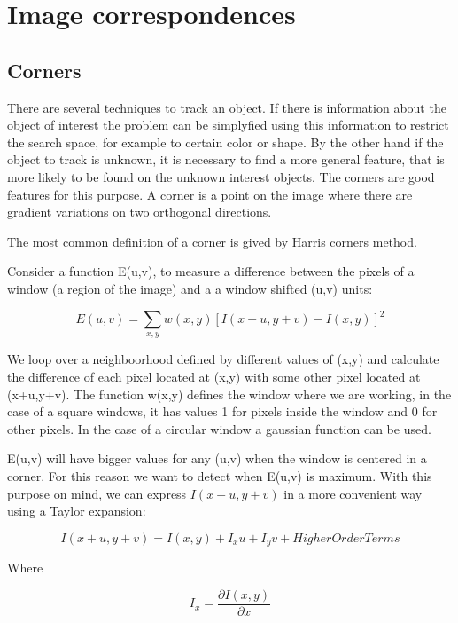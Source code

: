  


\section{Image correspondences}

\subsection{Corners}

There are several techniques to track an object. If there is information about the object of interest the problem 
can be simplyfied using this information to restrict the search space, for example to certain color or shape.
 By the other hand if the object to track is unknown, it is necessary to find a more general feature, that is 
more likely to be found on the unknown interest objects. The corners are good features for this purpose. A corner 
is a point on the image where there are gradient variations on two orthogonal directions.

The most common definition of a corner is gived by Harris corners method.

Consider a function E(u,v), to measure a difference between the pixels of a window (a region of the image) and 
a a window shifted (u,v) units:

\begin{equation}
E(u,v) = \sum\limits_{x,y} { w(x,y) [I(x + u, y +v) - I(x,y)]^2  }
\label{eq:harris1}
\end{equation}

We loop over a neighboorhood defined by different values of (x,y) and calculate 
the difference of each pixel located at (x,y) with some other pixel located at (x+u,y+v). 
The function w(x,y) defines the window where we are working, in the case of a square windows, 
it has values 1 for pixels inside the window and 0 for other pixels. In the case of a circular 
window a gaussian function can be used. 

E(u,v) will have bigger values for any (u,v) when the window is centered in a corner. For this reason we want 
to detect when E(u,v) is maximum. With this purpose on mind, we can express $I(x + u, y +v)$ in a more convenient
 way using a Taylor expansion:

$$
I(x+u,y +v) = I(x,y) + I_xu + I_yv + Higher Order Terms
$$ 

Where 

$$
I_x = \frac{\partial{I(x,y)}}{\partial{x}}
$$

